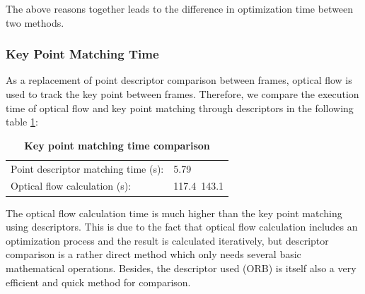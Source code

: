 \documentclass{easychair}
\begin{document}
The above reasons together leads to the difference in optimization time between two methods.



\subsubsection{Key Point Matching Time}
As a replacement of point descriptor comparison between frames, optical flow is used to track the key point between frames. Therefore, we compare the execution time of optical flow and key point matching through descriptors in the following table \ref{tab:matching}:

\begin{table}
	\centering
	\caption{\textbf{Key point matching time comparison}}
	\label{tab:matching}
	\begin{tabular}{ll}
		Point descriptor matching time (s): &5.79\\
		Optical flow calculation (s): & 117.4~143.1   \\              
	\end{tabular}
\end{table}

The optical flow calculation time is much higher than the key point matching using descriptors. This is due to the fact that optical flow calculation includes an optimization process and the result is calculated iteratively, but descriptor comparison is a rather direct method which only needs several basic mathematical operations. Besides, the descriptor used (ORB) is itself also a very efficient and quick method for comparison.
\end{document}
